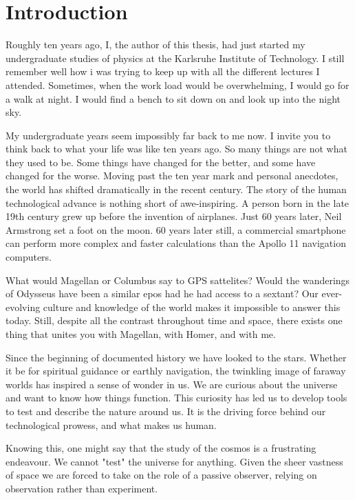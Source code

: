 
\chapter*{Introduction}
\label{chap:introduction}

\setlength{\parindent}{20pt}
\setlength{\parskip}{2pt}

Roughly ten years ago, I, the author of this thesis, had just started my 
undergraduate studies of physics at the Karlsruhe Institute of Technology. I still
remember well how i was trying to keep up with all the different lectures I 
attended. Sometimes, when the work load would be overwhelming, I would go for a 
walk at night. I would find a bench to sit down on and look up into the night sky.

My undergraduate years seem impossibly far back to me now. I invite you to think 
back to what your life was like ten years ago. So many things are not what they 
used to be. Some things have changed for the better, and some have changed for 
the worse. Moving past the ten year mark and personal anecdotes, the world has 
shifted dramatically in the recent century. The story of the human technological 
advance is nothing short of awe-inspiring. A person born in the late 19th century 
grew up before the invention of airplanes. Just 60 years later, Neil Armstrong set 
a foot on the moon. 60 years later still, a commercial smartphone can perform more 
complex and faster calculations than the Apollo 11 navigation computers.

What would Magellan or Columbus say to GPS sattelites? Would the wanderings of 
Odysseus have been a similar epos had he had access to a sextant? Our 
ever-evolving culture and knowledge of the world makes it impossible to answer 
this today. Still, despite all the contrast throughout time and space, there 
exists one thing that unites you with Magellan, with Homer, and with me.


Since the beginning of documented history we have looked to the stars. Whether
it be for spiritual guidance or earthly navigation, the twinkling image of 
faraway worlds has inspired a sense of wonder in us. We are curious about the 
universe and want to know how things function. This curiosity has led us to 
develop tools to test and describe the nature around us. It is the driving force 
behind our technological prowess, and what makes us human.

Knowing this, one might say that the study of the cosmos is a frustrating 
endeavour. We cannot "test" the universe for anything. Given the sheer vastness 
of space we are forced to take on the role of a passive observer, relying on 
observation rather than experiment.  


\setlength{\parindent}{0pt}
\setlength{\parskip}{7pt}
